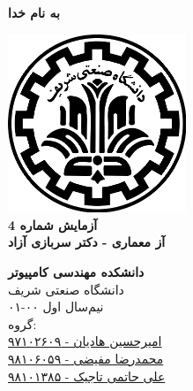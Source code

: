 \documentclass{article}
\begin{document}
\begin{titlepage}
	\begin{center}
		\textbf{ \Huge{به نام خدا}}	
		\vspace{0.2cm}
		
		\includegraphics[width=0.4\textwidth]{sharif.png}\\
		\vspace{0.2cm}
		\textbf{ \Huge{آزمایش شماره 4}}\\
		\vspace{0.25cm}
		\textbf{ \Large{آز معماری - دکتر سربازی آزاد}}
		\vspace{0.2cm}
		
		
		\large \textbf{دانشکده مهندسی کامپیوتر}\\\vspace{0.1cm}
		\large   دانشگاه صنعتی شریف\\\vspace{0.2cm}
		\large   ﻧﯿﻢ‌سال اول ۰۰-۰۱ \\\vspace{0.10cm}
		\large{گروه:}\\
		\large{\href{mailto:a.h.hadian@gmail.com}{امیرحسین هادیان - ۹۷۱۰۲۶۰۹}}\\
		\large{\href{mailto:mofayezi.m@gmail.com}{محمدرضا مفیضی - ۹۸۱۰۶۰۵۹}}\\
		\large{\href{mailto:a.hatam008@gmail.com}{علی حاتمی تاجیک - ۹۸۱۰۱۳۸۵}}\\
	\end{center}
\end{titlepage}

\newpage

\pagestyle{fancy}
\fancyhf{}
\fancyfoot{}
\setlength{\headheight}{59pt}
\cfoot{\thepage}
\end{document}

